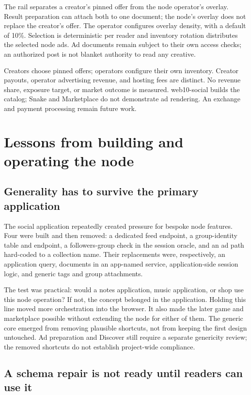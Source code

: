 \documentclass[sigconf, nonacm]{acmart}
\begin{document}
The rail separates a creator's pinned offer from the node operator's
overlay. Result preparation can attach both to one
document; the node's overlay does not replace the creator's offer.
The operator configures overlay density, with a default of 10\%.
Selection is deterministic per reader and inventory rotation distributes
the selected node ads. Ad documents remain subject to their own access
checks; an authorized post is not blanket authority to read any creative.

Creators choose pinned offers; operators configure their own inventory.
Creator payouts, operator advertising revenue, and hosting fees are
distinct. No revenue share, exposure target, or market outcome is measured.
web10-social builds the catalog; Snake and Marketplace do not demonstrate
ad rendering. An exchange and payment processing remain future work.

\section{Lessons from building and operating the node}
\label{sec:lessons}

\subsection{Generality has to survive the primary application}

The social application repeatedly created pressure for bespoke node
features. Four were built and then removed: a dedicated feed endpoint,
a group-identity table and endpoint, a followers-group check in the
session oracle, and an ad path hard-coded to a collection name. Their
replacements were, respectively, an application query, documents in an
app-named service, application-side session logic, and generic tags and
group attachments.

The test was practical: would a notes application, music application,
or shop use this node operation? If not, the concept belonged in the
application. Holding this line moved more orchestration into the browser.
It also made the later game and marketplace possible without extending
the node for either of them. The generic core emerged from removing
plausible shortcuts, not from keeping the first design untouched.
Ad preparation and Discover still require a separate genericity review;
the removed shortcuts do not establish project-wide compliance.

\subsection{A schema repair is not ready until readers can use it}
\end{document}
